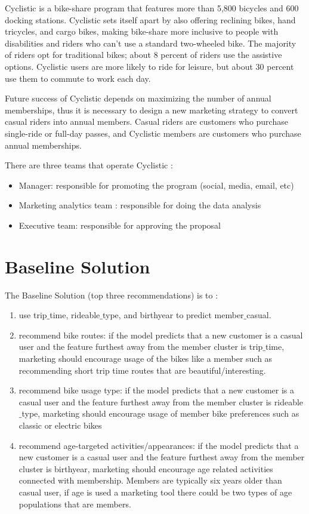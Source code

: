 \documentclass[11pt, onecolumn]{article}
\begin{document}
Cyclistic is a bike-share program that features more than 5,800 bicycles and 600 docking stations. Cyclistic sets itself apart by also oﬀering reclining bikes, hand tricycles, and cargo bikes, making bike-share more inclusive to people with disabilities and riders who can’t use a standard two-wheeled bike. The majority of riders opt for traditional bikes; about 8 percent of riders use the assistive options. Cyclistic users are more likely to ride for leisure, but about 30 percent use them to commute to work each day. 

Future success of Cyclistic depends on maximizing the number of annual memberships, thus it is necessary to design a new marketing strategy to convert casual riders into annual members. Casual riders are customers who purchase single-ride or full-day passes, and Cyclistic members are customers who purchase annual memberships. 

There are three teams that operate Cyclistic : 
\begin{itemize}
\item Manager: responsible for promoting the program (social, media, email, etc)
\item Marketing analytics team : responsible for doing the data analysis
\item Executive team: responsible for approving the proposal
\end{itemize}


\section{Baseline Solution}

The Baseline Solution (top three recommendations) is to :
\begin{enumerate}
\item use trip$\_$time, rideable$\_$type, and birthyear to predict member$\_$casual. 
\item recommend bike routes: if the model predicts that a new customer is a casual user and the feature furthest away from the member cluster is trip$\_$time, marketing should encourage usage of the bikes like a member such as recommending short trip time routes that are beautiful/interesting.
\item recommend bike usage type: if the model predicts that a new customer is a casual user and the feature furthest away from the member cluster is rideable$\_$type, marketing should encourage usage of member bike preferences such as classic or electric bikes 
\item recommend age-targeted activities/appearances: if the model predicts that a new customer is a casual user and the feature furthest away from the member cluster is birthyear, marketing should encourage age related activities connected with membership. Members are typically six years older than casual user, if age is used a marketing tool there could be two types of age populations that are members.
\end{enumerate}
\end{document}
